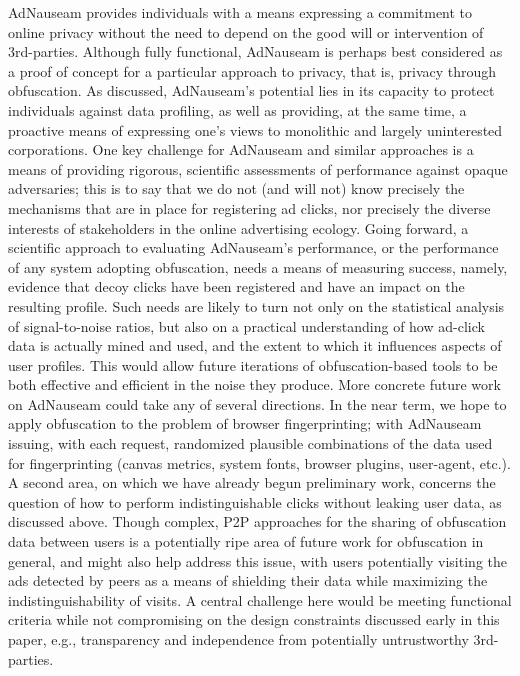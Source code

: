 \documentclass[conference]{IEEEtran}
\begin{document}
AdNauseam provides individuals with a means expressing a commitment to online privacy without the need to depend on the good will or intervention of 3rd-parties. Although fully functional, AdNauseam is perhaps best considered as a proof of concept for a particular approach to privacy, that is, privacy through obfuscation. As discussed, AdNauseam's potential lies in its capacity to protect individuals against data profiling, as well as providing, at the same time, a proactive means of expressing one's views to monolithic and largely uninterested corporations.
One key challenge for AdNauseam and similar approaches is a means of providing rigorous, scientific assessments of performance against opaque adversaries; this is to say that we do not (and will not) know precisely the mechanisms that are in place for registering ad clicks, nor precisely the diverse interests of stakeholders in the online advertising ecology.
Going forward, a scientific approach to evaluating AdNauseam's performance, or the performance of any system adopting obfuscation, needs a means of measuring success, namely, evidence that decoy clicks have been registered and have an impact on the resulting profile. Such needs are likely to turn not only on the statistical analysis of signal-to-noise ratios, but also on a practical understanding of how ad-click data is actually mined and used, and the extent to which it influences aspects of user profiles. This would allow future iterations of obfuscation-based tools to be both effective and efficient in the noise they produce.
More concrete future work on AdNauseam could take any of several directions. In the near term, we hope to apply obfuscation to the problem of browser fingerprinting; with AdNauseam issuing, with each request, randomized plausible combinations of the data used for fingerprinting (canvas metrics, system fonts, browser plugins, user-agent, etc.). A second area, on which we have already begun preliminary work, concerns the question of how to perform indistinguishable clicks without leaking user data, as discussed above. Though complex, P2P approaches for the sharing of obfuscation data between users is a potentially ripe area of future work for obfuscation in general, and might also help address this issue, with users potentially visiting the ads detected by peers as a means of shielding their data while maximizing the indistinguishability of visits. A central challenge here would be meeting functional criteria while not compromising on the design constraints discussed early in this paper, e.g., transparency and independence from potentially untrustworthy 3rd-parties.
\end{document}
